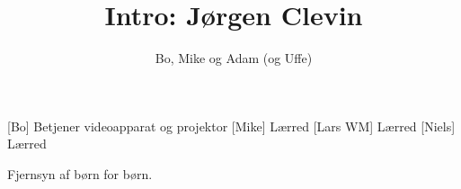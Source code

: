 \documentclass[danish]{article}
\title{Intro: Jørgen Clevin}
\author{Bo, Mike og Adam (og Uffe)}
\begin{document}
\maketitle

\begin{roles}
  [Bo] Betjener videoapparat og projektor
  [Mike] Lærred
  [Lars WM] Lærred
  [Niels] Lærred
\end{roles}

\begin{sketch}

\scene Fjernsyn af børn for børn.

\end{sketch}
\end{document}
